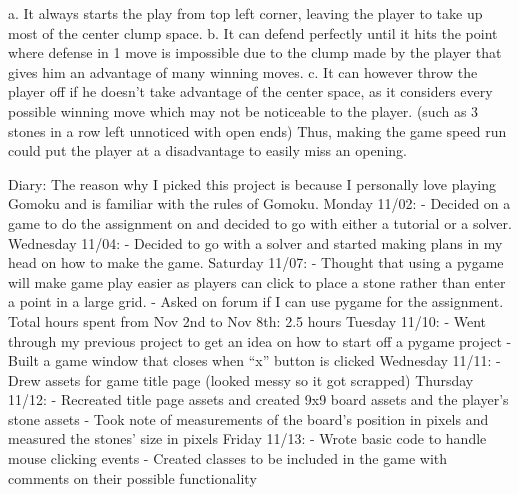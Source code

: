 a.	It always starts the play from top left corner, leaving the player to take up most of the center clump space.
b.	It can defend perfectly until it hits the point where defense in 1 move is impossible due to the clump made by the player that gives him an advantage of many winning moves.
c.	It can however throw the player off if he doesn’t take advantage of the center space, as it considers every possible winning move which may not be noticeable to the player. (such as 3 stones in a row left unnoticed with open ends) Thus, making the game speed run could put the player at a disadvantage to easily miss an opening.



















Diary:
The reason why I picked this project is because I personally love playing Gomoku and is familiar with the rules of Gomoku.
Monday 11/02:
-	Decided on a game to do the assignment on and decided to go with either a tutorial or a solver.
Wednesday 11/04:
-	Decided to go with a solver and started making plans in my head on how to make the game.
Saturday 11/07:
-	Thought that using a pygame will make game play easier as players can click to place a stone rather than enter a point in a large grid.
-	Asked on forum if I can use pygame for the assignment.
Total hours spent from Nov 2nd to Nov 8th: 2.5 hours
Tuesday 11/10:
-	Went through my previous project to get an idea on how to start off a pygame project
-	Built a game window that closes when “x” button is clicked
Wednesday 11/11:
-	Drew assets for game title page (looked messy so it got scrapped)
Thursday 11/12:
-	Recreated title page assets and created 9x9 board assets and the player’s stone assets
-	Took note of measurements of the board’s position in pixels and measured the stones’ size in pixels
Friday 11/13:
-	Wrote basic code to handle mouse clicking events
-	Created classes to be included in the game with comments on their possible functionality

